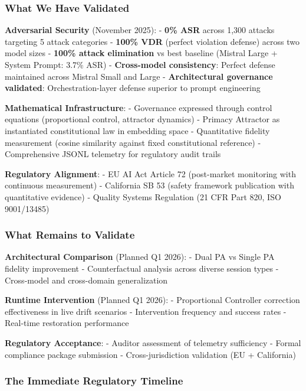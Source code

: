 \subsubsection{What We Have Validated}\label{what-we-have-validated}

\textbf{Adversarial Security} (November 2025): - \textbf{0\% ASR} across
1,300 attacks targeting 5 attack categories - \textbf{100\% VDR}
(perfect violation defense) across two model sizes - \textbf{100\%
attack elimination} vs best baseline (Mistral Large + System Prompt:
3.7\% ASR) - \textbf{Cross-model consistency}: Perfect defense
maintained across Mistral Small and Large - \textbf{Architectural
governance validated}: Orchestration-layer defense superior to prompt
engineering

\textbf{Mathematical Infrastructure}: - Governance expressed through
control equations (proportional control, attractor dynamics) - Primacy
Attractor as instantiated constitutional law in embedding space -
Quantitative fidelity measurement (cosine similarity against fixed
constitutional reference) - Comprehensive JSONL telemetry for regulatory
audit trails

\textbf{Regulatory Alignment}: - EU AI Act Article 72 (post-market
monitoring with continuous measurement) - California SB 53 (safety
framework publication with quantitative evidence) - Quality Systems
Regulation (21 CFR Part 820, ISO 9001/13485)

\subsubsection{What Remains to Validate}\label{what-remains-to-validate}

\textbf{Architectural Comparison} (Planned Q1 2026): - Dual PA vs Single
PA fidelity improvement - Counterfactual analysis across diverse session
types - Cross-model and cross-domain generalization

\textbf{Runtime Intervention} (Planned Q1 2026): - Proportional
Controller correction effectiveness in live drift scenarios -
Intervention frequency and success rates - Real-time restoration
performance

\textbf{Regulatory Acceptance}: - Auditor assessment of telemetry
sufficiency - Formal compliance package submission - Cross-jurisdiction
validation (EU + California)

\subsubsection{The Immediate Regulatory
Timeline}\label{the-immediate-regulatory-timeline}

